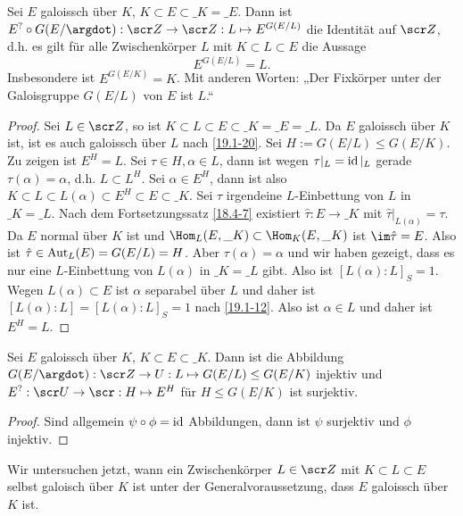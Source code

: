\begin{st} \label{19.4-13}
	Sei $E$ galoissch über $K$, $K \subset E \subset \_K = \_E$.
	Dann ist $E^? \circ G(E / \argdot) : \scr Z \to \scr Z : L \mapsto E^{G(E / L)}$ die Identität auf $\scr Z$, d.h. es gilt für alle Zwischenkörper $L$ mit $K \subset L \subset E$ die Aussage
	\[
		E^{G(E / L)} = L.
	\]
	Insbesondere ist $E^{G(E/K)} = K$.
	Mit anderen Worten: „Der Fixkörper unter der Galoisgruppe $G(E / L)$ von $E$ ist $L$.“
	\begin{proof}
		Sei $L \in \scr Z$, so ist $K \subset L \subset E \subset \_K = \_E = \_L$.
		Da $E$ galoissch über $K$ ist, ist es auch galoissch über $L$ nach \ref{19.1-20}.
		Sei $H := G(E / L) \le G(E / K)$.
		Zu zeigen ist $E^H = L$.
		Sei $\tau \in H, \alpha \in L$, dann ist wegen $\tau|_L = \operatorname{id}|_L$ gerade $\tau(\alpha) = \alpha$, d.h. $L \subset L^H$.
		Sei $\alpha \in E^H$, dann ist also $K \subset L \subset L(\alpha) \subset E^H \subset E \subset \_K$.
		Sei $\tau$ irgendeine $L$-Einbettung von $L$ in $\_K = \_L$.
		Nach dem Fortsetzungssatz \ref{18.4-7} existiert $\hat \tau: E \to \_K$ mit $\hat \tau|_{L(\alpha)} = \tau$.
		Da $E$ normal über $K$ ist und $\Hom_L(E, \_K) \subset \Hom_K (E, \_K)$ ist $\im \hat \tau = E$.
		Also ist $\hat \tau \in \operatorname{Aut}_L(E) = G(E / L) = H$.
		Aber $\tau(\alpha) = \alpha$ und wir haben gezeigt, dass es nur eine $L$-Einbettung von $L(\alpha)$ in $\_K = \_L$ gibt.
		Also ist $[L(\alpha) : L]_S = 1$.
		Wegen $L(\alpha) \subset E$ ist $\alpha$ separabel über $L$ und daher ist $[L(\alpha) : L] = [L(\alpha) : L]_S = 1$ nach \ref{19.1-12}.
		Also ist $\alpha \in L$ und daher ist $E^H = L$.
	\end{proof}
\end{st}

\begin{kor} \label{19.4-14}
	Sei $E$ galoissch über $K$, $K \subset E \subset \_K$.
	Dann ist die Abbildung $G(E / \argdot): \scr Z \to U : L \mapsto G(E / L) \le G(E / K)$ injektiv und $E^? : \scr U \to \scr : H \mapsto E^H$ für $H \le G(E / K)$ ist surjektiv.
	\begin{proof}
		Sind allgemein $\psi \circ \phi = \operatorname{id}$ Abbildungen, dann ist $\psi$ surjektiv und $\phi$ injektiv.
	\end{proof}
\end{kor}

Wir untersuchen jetzt, wann ein Zwischenkörper $L \in \scr Z$ mit $K \subset L \subset E$ selbst galoisch über $K$ ist unter der Generalvoraussetzung, dass $E$ galoissch über $K$ ist.

